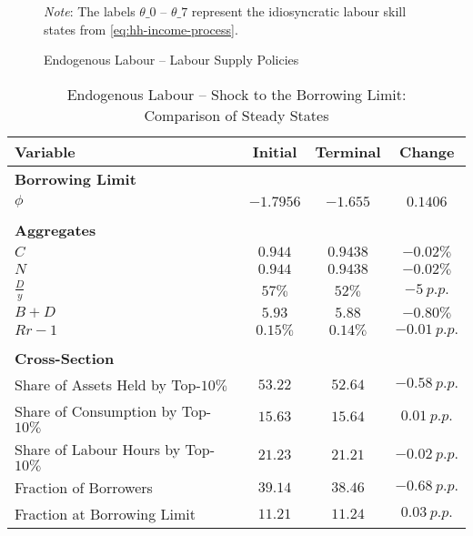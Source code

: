 \documentclass[a4paper,12pt]{article} %
\numberwithin{equation}{section} %
\numberwithin{figure}{section}
\numberwithin{table}{section}
\begin{document}
\begin{refsection}
\begin{appendices}
\begin{figure}[H]
    \centering
    \caption{Endogenous Labour -- Labour Supply Policies}
    \label{fig:init-stst-end-L-pol-n}
    

    \vspace{10pt}
    
    \begin{minipage}{0.75\textwidth}
    \footnotesize
    \textit{Note}: The labels $\theta\_0$ -- $\theta\_7$ represent the idiosyncratic labour skill states from \eqref{eq:hh-income-process}.
    \end{minipage}
\end{figure}

\begin{table}[H]
\centering
\caption{Endogenous Labour -- Shock to the Borrowing Limit: \\ Comparison of Steady States}
\label{tab:stst_comparison_end_L_limit_permanent}
\begin{tabular}{lccc}
Variable & Initial & Terminal &  Change \\
\hline
\hline
\multicolumn{2}{l}{\textbf{Borrowing Limit}} & & \\
$\phi$ & $-1.7956$ &   $-1.655$ &  $0.1406$ \\
& & & \\
\multicolumn{2}{l}{\textbf{Aggregates}} & & \\
$C$ &   $0.944$ &   $0.9438$ & $-0.02\%$ \\
$N$ &   $0.944$ &   $0.9438$ & $-0.02\%$ \\
$\frac{D}{y}$ & $57\%$ & $52\%$ & $-5 \ p.p.$ \\
$B+D$ &  $5.93$ &   $5.88$ & $-0.80\%$ \\
$Rr-1$ &  $0.15\%$ & $0.14\%$ & $-0.01 \ p.p.$ \\
& & & \\
\multicolumn{2}{l}{\textbf{Cross-Section}} & & \\
Share of Assets Held by Top-$10\%$ &  $53.22$ &   $52.64$ & $-0.58 \ p.p.$ \\
Share of Consumption by Top-$10\%$ &  $15.63$ &   $15.64$ &  $0.01 \ p.p.$ \\
Share of Labour Hours by Top-$10\%$ &  $21.23$ &   $21.21$ & $-0.02 \ p.p.$ \\
Fraction of Borrowers &   $39.14$ &    $38.46$ & $-0.68 \ p.p.$ \\
Fraction at Borrowing Limit &   $11.21$ &    $11.24$ &  $0.03 \ p.p.$ \\

\end{tabular}
\end{table}
\end{appendices}
\end{refsection}
\end{document}
